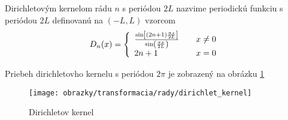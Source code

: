 \begin{definicia}
Dirichletovým kernelom  rádu $n$ s periódou $2L$ nazvime periodickú funkciu
s periódou $2L$ definovanú na $(-L,L)$ vzorcom
\begin{equation}
    D_n(x) = \left\{
        \begin{array}{l l}
            \frac{\sin\left[(2n+1) \frac{\pi x}{2 L}\right]}{
            \sin\left(\frac{\pi x}{2 L}\right)} \quad& x\not=0 \\
            2n+1 \quad& x=0
        \end{array}
    \right.
\end{equation}
\end{definicia}

Priebeh dirichletovho kernelu s periódou $2\pi$ je zobrazený na
obrázku
\ref{fig:dirichlet_kernel}

\begin{figure}[htp]
    \centering
    \texttt{[image: obrazky/transformacia/rady/dirichlet\_kernel]}
    \caption{Dirichletov kernel}
    \label{fig:dirichlet_kernel}
\end{figure}

